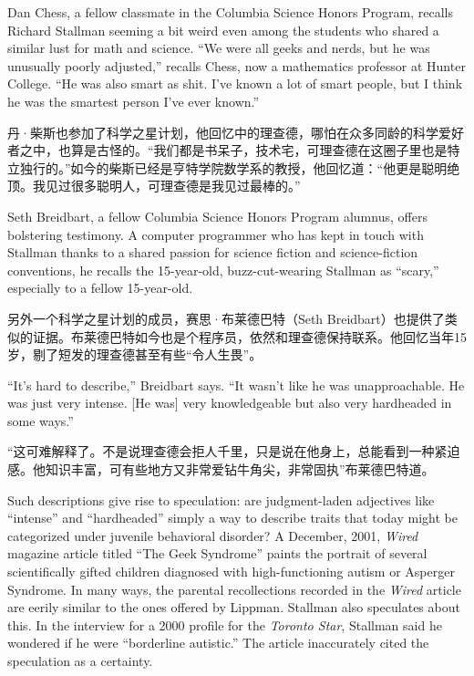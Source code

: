 \ifdefined\eng
Dan Chess, a fellow classmate in the Columbia Science Honors Program, recalls Richard Stallman seeming a bit weird even among the students who shared a similar lust for math and science. ``We were all geeks and nerds, but he was unusually poorly adjusted,'' recalls Chess, now a mathematics professor at Hunter College. ``He was also smart as shit. I've known a lot of smart people, but I think he was the smartest person I've ever known.''
\fi

\ifdefined\chs
丹·柴斯也参加了科学之星计划，他回忆中的理查德，哪怕在众多同龄的科学爱好者之中，也算是古怪的。“我们都是书呆子，技术宅，可理查德在这圈子里也是特立独行的。”如今的柴斯已经是亨特学院数学系的教授，他回忆道：“他更是聪明绝顶。我见过很多聪明人，可理查德是我见过最棒的。”
\fi

\ifdefined\eng
Seth Breidbart, a fellow Columbia Science Honors Program alumnus, offers bolstering testimony. A computer programmer who has kept in touch with Stallman thanks to a shared passion for science fiction and science-fiction conventions, he recalls the 15-year-old, buzz-cut-wearing Stallman as ``scary,'' especially to a fellow 15-year-old.
\fi

\ifdefined\chs
另外一个科学之星计划的成员，赛思·布莱德巴特（Seth Breidbart）也提供了类似的证据。布莱德巴特如今也是个程序员，依然和理查德保持联系。他回忆当年15岁，剔了短发的理查德甚至有些“令人生畏”。
\fi

\ifdefined\eng
``It's hard to describe,'' Breidbart says. ``It wasn't like he was unapproachable. He was just very intense. [He was] very knowledgeable but also very hardheaded in some ways.''
\fi

\ifdefined\chs
“这可难解释了。不是说理查德会拒人千里，只是说在他身上，总能看到一种紧迫感。他知识丰富，可有些地方又非常爱钻牛角尖，非常固执”布莱德巴特道。
\fi

\ifdefined\eng
Such descriptions give rise to speculation: are judgment-laden adjectives like ``intense'' and ``hardheaded'' simply a way to describe traits that today might be categorized under juvenile behavioral disorder? A December, 2001, \textit{Wired} magazine article titled ``The Geek Syndrome'' paints the portrait of several scientifically gifted children diagnosed with high-functioning autism or Asperger Syndrome. In many ways, the parental recollections recorded in the \textit{Wired} article are eerily similar to the ones offered by Lippman. Stallman also speculates about this.  In the interview for a 2000 profile for the \textit{Toronto Star}, Stallman said he wondered if he were ``borderline autistic.''  The article inaccurately cited the speculation as a certainty.
\fi

